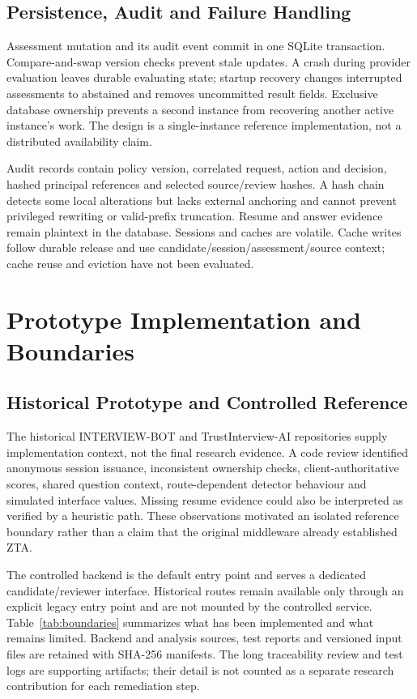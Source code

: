 \documentclass[conference]{IEEEtran}
\begin{document}
\subsection{Persistence, Audit and Failure Handling}
Assessment mutation and its audit event commit in one SQLite transaction. Compare-and-swap version checks prevent stale updates. A crash during provider evaluation leaves durable evaluating state; startup recovery changes interrupted assessments to abstained and removes uncommitted result fields. Exclusive database ownership prevents a second instance from recovering another active instance's work. The design is a single-instance reference implementation, not a distributed availability claim.

Audit records contain policy version, correlated request, action and decision, hashed principal references and selected source/review hashes. A hash chain detects some local alterations but lacks external anchoring and cannot prevent privileged rewriting or valid-prefix truncation. Resume and answer evidence remain plaintext in the database. Sessions and caches are volatile. Cache writes follow durable release and use candidate/session/assessment/source context; cache reuse and eviction have not been evaluated.

\section{Prototype Implementation and Boundaries}
\subsection{Historical Prototype and Controlled Reference}
The historical INTERVIEW-BOT and TrustInterview-AI repositories supply implementation context, not the final research evidence. A code review identified anonymous session issuance, inconsistent ownership checks, client-authoritative scores, shared question context, route-dependent detector behaviour and simulated interface values. Missing resume evidence could also be interpreted as verified by a heuristic path. These observations motivated an isolated reference boundary rather than a claim that the original middleware already established ZTA.

The controlled backend is the default entry point and serves a dedicated candidate/reviewer interface. Historical routes remain available only through an explicit legacy entry point and are not mounted by the controlled service. Table~\ref{tab:boundaries} summarizes what has been implemented and what remains limited. Backend and analysis sources, test reports and versioned input files are retained with SHA-256 manifests. The long traceability review and test logs are supporting artifacts; their detail is not counted as a separate research contribution for each remediation step.
\end{document}
